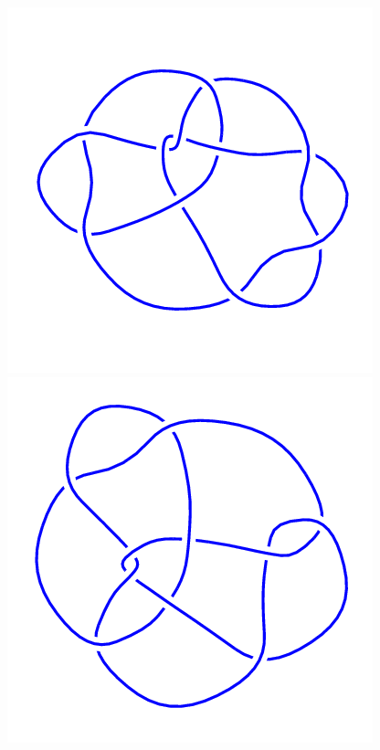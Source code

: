 \begin{figure}[H]
\begin{minipage}[b]{.18\linewidth}
	\end{minipage}
	\begin{minipage}[b]{.18\linewidth}
		\centering
		\includegraphics[width=\linewidth]{../data/10_94.png}
	\end{minipage}
	\begin{minipage}[b]{.18\linewidth}
		\centering
		\includegraphics[width=\linewidth]{../data/10_95.png}

\end{minipage}
\end{figure}
